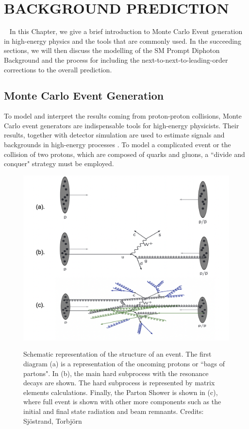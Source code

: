 \chapter{BACKGROUND PREDICTION}~\label{ch:background}\RaggedRight \parindent=25pt
In this Chapter, we give a brief introduction to Monte Carlo Event generation in high-energy physics and the tools that are commonly used. In the succeeding sections, we will then discuss the modelling of the SM Prompt Diphoton Background and the process for including the next-to-next-to-leading-order corrections to the overall prediction. 

\section{Monte Carlo Event Generation}

To model and interpret the results coming from proton-proton collisions, Monte Carlo event generators are indispensable tools for high-energy physicists. Their results, together with detector simulation are used to estimate signals and backgrounds in high-energy processes \cite{Tanabashi:2018oca}. To model a complicated event or the collision of two protons, which are composed of quarks and gluons, a ``divide and conquer" strategy must be employed.  

\begin{figure}[!htbp]
    \caption{Schematic representation of the structure of an event. The first diagram (a) is a representation of the oncoming protons or ``bags of partons". In (b), the main hard subprocess with the resonance decays are shown. The hard subprocess is represented by matrix elements calculations. Finally, the Parton Shower is shown in (c), where full event is shown with other more components such as the initial and final state radiation and beam remnants. Credits: Sj{\"o}strand, Torbj{\"o}rn}
	\centering
	\includegraphics[scale=0.5]{fig/eventStructure.png}
	\label{fig:EventStructure}
\end{figure}


